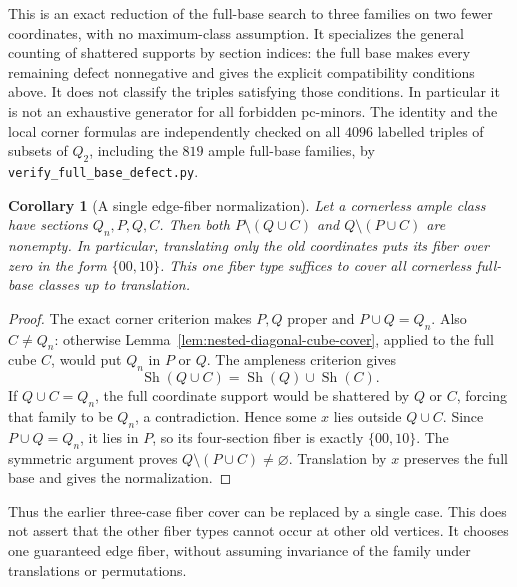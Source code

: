 \documentclass[11pt]{article}
\numberwithin{equation}{section}
\newtheorem{corollary}[theorem]{Corollary}
\theoremstyle{definition}
\theoremstyle{remark}
\begin{document}
This is an exact reduction of the full-base search to three families
on two fewer coordinates, with no maximum-class assumption. It
specializes the general counting of shattered supports by section
indices: the full base makes every remaining defect nonnegative
and gives the explicit compatibility conditions above. It does not
classify the triples satisfying those conditions. In particular it
is not an exhaustive generator for all forbidden pc-minors. The
identity and the local corner formulas are independently checked
on all $4096$ labelled triples of subsets of $Q_2$, including the
$819$ ample full-base families, by
\texttt{verify\_full\_base\_defect.py}.

\begin{corollary}[A single edge-fiber normalization]
\label{cor:full-base-edge-normalization}
Let a cornerless ample class have sections $Q_n,P,Q,C$.
Then both $P\setminus(Q\cup C)$ and $Q\setminus(P\cup C)$ are
nonempty. In particular, translating only the old coordinates puts
its fiber over zero in the form $\{00,10\}$. This one fiber type
suffices to cover all cornerless full-base classes up to translation.
\end{corollary}
\begin{proof}
The exact corner criterion makes $P,Q$ proper and $P\cup Q=Q_n$.
Also $C\ne Q_n$: otherwise Lemma~\ref{lem:nested-diagonal-cube-cover},
applied to the full cube $C$, would put $Q_n$ in $P$ or $Q$.
The ampleness criterion gives
\[
 \operatorname{Sh}(Q\cup C)
 =\operatorname{Sh}(Q)\cup\operatorname{Sh}(C).
\]
If $Q\cup C=Q_n$, the full coordinate support would be shattered
by $Q$ or $C$, forcing that family to be $Q_n$, a contradiction.
Hence some $x$ lies outside $Q\cup C$. Since $P\cup Q=Q_n$, it lies
in $P$, so its four-section fiber is exactly $\{00,10\}$.
The symmetric argument proves $Q\setminus(P\cup C)\ne\varnothing$.
Translation by $x$ preserves the full base and gives the normalization.
\end{proof}

Thus the earlier three-case fiber cover can be replaced by a single
case. This does not assert that the other fiber types cannot occur at
other old vertices. It chooses one guaranteed edge fiber, without
assuming invariance of the family under translations or permutations.
\end{document}
